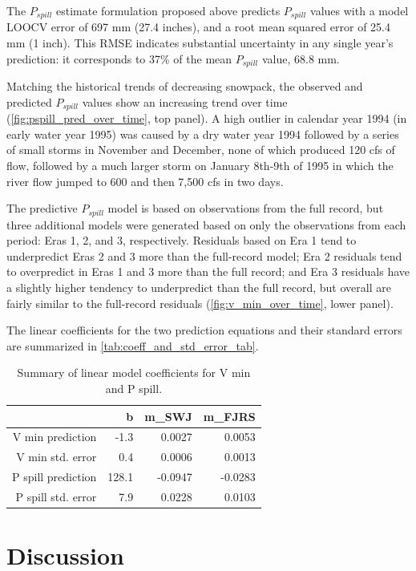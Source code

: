 \documentclass[hess, manuscript]{copernicus}
\begin{document}
The \(P_{spill}\) estimate formulation proposed above predicts
\(P_{spill}\) values with a model LOOCV error of 697 mm (27.4 inches),
and a root mean squared error of 25.4 mm (1 inch). This RMSE indicates
substantial uncertainty in any single year's prediction: it corresponds
to 37\% of the mean \(P_{spill}\) value, 68.8 mm.

Matching the historical trends of decreasing snowpack, the observed and
predicted \(P_{spill}\) values show an increasing trend over time
(\autoref{fig:pspill_pred_over_time}, top panel). A high outlier in
calendar year 1994 (in early water year 1995) was caused by a dry water
year 1994 followed by a series of small storms in November and December,
none of which produced 120 cfs of flow, followed by a much larger storm
on January 8th-9th of 1995 in which the river flow jumped to 600 and
then 7,500 cfs in two days.

The predictive \(P_{spill}\) model is based on observations from the
full record, but three additional models were generated based on only
the observations from each period: Eras 1, 2, and 3, respectively.
Residuals based on Era 1 tend to underpredict Eras 2 and 3 more than the
full-record model; Era 2 residuals tend to overpredict in Eras 1 and 3
more than the full record; and Era 3 residuals have a slightly higher
tendency to underpredict than the full record, but overall are fairly
similar to the full-record residuals (\autoref{fig:v_min_over_time},
lower panel).

The linear coefficients for the two prediction equations and their
standard errors are summarized in \autoref{tab:coeff_and_std_error_tab}.

\begin{table}[ht]
\centering
\caption{Summary of linear model coefficients for V min and P spill.} 
\label{tab:coeff_and_std_error_tab}
\begin{tabular}{rrrr}
  \hline
 & b & m\_SWJ & m\_FJRS \\ 
  \hline
V min prediction & -1.3 & 0.0027 & 0.0053 \\ 
  V min std. error & 0.4 & 0.0006 & 0.0013 \\ 
  P spill prediction & 128.1 & -0.0947 & -0.0283 \\ 
  P spill std. error & 7.9 & 0.0228 & 0.0103 \\ 
   \hline
\end{tabular}
\end{table}

\section{Discussion}
\end{document}

